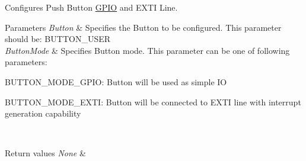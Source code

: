 Configures Push Button \hyperlink{structGPIO}{G\+P\+IO} and E\+X\+TI Line. 


\begin{DoxyParams}{Parameters}
{\em Button} & Specifies the Button to be configured. This parameter should be\+: B\+U\+T\+T\+O\+N\+\_\+\+U\+S\+ER \\
\hline
{\em Button\+Mode} & Specifies Button mode. This parameter can be one of following parameters\+: \begin{DoxyItemize}
\item B\+U\+T\+T\+O\+N\+\_\+\+M\+O\+D\+E\+\_\+\+G\+P\+IO\+: Button will be used as simple IO \item B\+U\+T\+T\+O\+N\+\_\+\+M\+O\+D\+E\+\_\+\+E\+X\+TI\+: Button will be connected to E\+X\+TI line with interrupt generation capability \end{DoxyItemize}
\\
\hline
\end{DoxyParams}

\begin{DoxyRetVals}{Return values}
{\em None} & \\
\hline
\end{DoxyRetVals}

